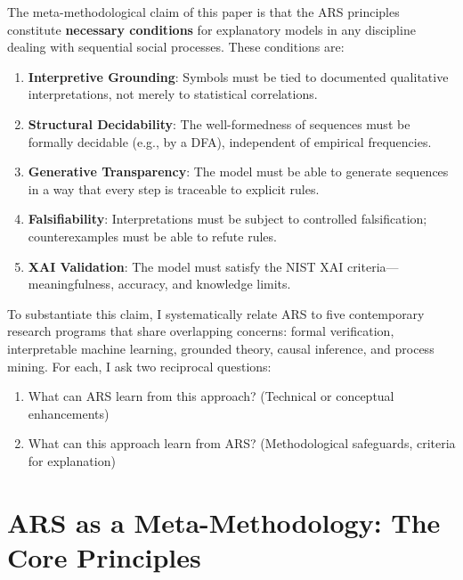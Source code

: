 \documentclass[12pt,a4paper]{article}
\begin{document}
The meta-methodological claim of this paper is that the ARS principles 
constitute \textbf{necessary conditions} for explanatory models in any 
discipline dealing with sequential social processes. These conditions are:

\begin{enumerate}
    \item \textbf{Interpretive Grounding}: Symbols must be tied to documented 
    qualitative interpretations, not merely to statistical correlations.
    
    \item \textbf{Structural Decidability}: The well-formedness of sequences 
    must be formally decidable (e.g., by a DFA), independent of empirical 
    frequencies.
    
    \item \textbf{Generative Transparency}: The model must be able to generate 
    sequences in a way that every step is traceable to explicit rules.
    
    \item \textbf{Falsifiability}: Interpretations must be subject to 
    controlled falsification; counterexamples must be able to refute rules.
    
    \item \textbf{XAI Validation}: The model must satisfy the NIST XAI 
    criteria—meaningfulness, accuracy, and knowledge limits.
\end{enumerate}

To substantiate this claim, I systematically relate ARS to five contemporary 
research programs that share overlapping concerns: formal verification, 
interpretable machine learning, grounded theory, causal inference, and process 
mining. For each, I ask two reciprocal questions:

\begin{enumerate}
    \item What can ARS learn from this approach? (Technical or conceptual 
    enhancements)
    
    \item What can this approach learn from ARS? (Methodological safeguards, 
    criteria for explanation)
\end{enumerate}

\section{ARS as a Meta-Methodology: The Core Principles}
\end{document}
